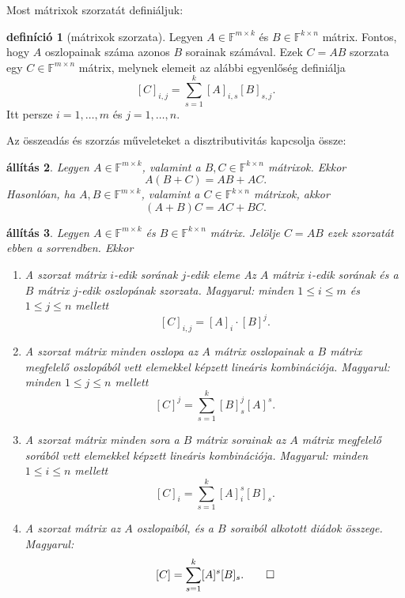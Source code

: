 \documentclass[9pt,showtrims]{memoir}
\theoremstyle{plain}
\newtheorem{proposition}{állítás}[section]
\theoremstyle{remark}
\theoremstyle{definition}
\newtheorem{definition}[proposition]{definíció}
\renewcommand{\mathbf}{\mathbb}
\begin{document}
Most mátrixok szorzatát definiáljuk:
\begin{definition}[mátrixok szorzata]
    Legyen $A\in\mathbf{F}^{m\times k}$ és $B\in\mathbf{F}^{k\times n}$ mátrix.
    Fontos, hogy $A$ oszlopainak száma azonos $B$ sorainak számával.
    Ezek $C=AB$ szorzata egy $C\in\mathbf{F}^{m\times n}$ mátrix,
    melynek elemeit az alábbi egyenlőség definiálja
    \[
        [C]_{i,j}=\sum_{s=1}^k[A]_{i,s}[B]_{s,j}.
    \]
    Itt persze $i=1,\dots,m$ és $j=1,\dots,n.$
\end{definition}
Az összeadás és szorzás műveleteket a disztributivitás kapcsolja össze:
\begin{proposition}
    Legyen $A\in\mathbf{F}^{m\times k}$, valamint a $B,C\in\mathbf{F}^{k\times n}$ mátrixok.
    Ekkor
    \begin{displaymath}
        A\left( B+C \right)=AB+AC.
    \end{displaymath}
    Hasonlóan,
    ha $A,B\in\mathbf{F}^{m\times k}$, valamint a $C\in\mathbf{F}^{k\times n}$ mátrixok,
    akkor
    \begin{displaymath}
        \left( A+B \right)C=AC+BC.
    \end{displaymath}
\end{proposition}
\begin{proposition}
    Legyen $A\in\mathbf{F}^{m\times k}$ és $B\in\mathbf{F}^{k\times n}$ mátrix.
    Jelölje $C=AB$ ezek szorzatát ebben a sorrendben.
    Ekkor
    \begin{enumerate}
        \item A szorzat mátrix $i$-edik sorának $j$-edik eleme Az $A$ mátrix $i$-edik sorának és a $B$ mátrix $j$-edik
            oszlopának szorzata. Magyarul: minden $1\leq i\leq m$ és $1\leq j \leq n$ mellett
            \[
                [C]_{i,j}=[A]_i\cdot [B]^j.
            \]
        \item
            A szorzat mátrix minden oszlopa az $A$ mátrix oszlopainak a $B$ mátrix megfelelő oszlopából vett elemekkel képzett
            lineáris kombinációja.
            Magyarul: minden $1\leq j\leq n$ mellett
            \[
                [C]^j=\sum_{s=1}^k[B]_s^j[A]^s.
            \]
        \item
            A szorzat mátrix minden sora a $B$ mátrix sorainak az $A$ mátrix megfelelő sorából vett elemekkel képzett
            lineáris kombinációja.
            Magyarul: minden $1\leq i\leq n$ mellett
            \[
                [C]_i=\sum_{s=1}^k[A]_i^s[B]_s.
            \]
        \item
            A szorzat mátrix az $A$ oszlopaiból, és a $B$ soraiból alkotott diádok összege.
            Magyarul:
            \[
                [C]=\sum_{s=1}^k[A]^s[B]_s.\qedhere
            \]
    \end{enumerate}
\end{proposition}
\end{document}
